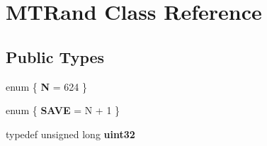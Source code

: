 \hypertarget{classMTRand}{}\section{M\+T\+Rand Class Reference}
\label{classMTRand}
\subsection*{Public Types}
\begin{DoxyCompactItemize}
\item 
\hypertarget{classMTRand_ab8fea37d16b55e1a0fe06149e325f1b6}{}enum \{ {\bfseries N} = 624
 \}\label{classMTRand_ab8fea37d16b55e1a0fe06149e325f1b6}

\item 
\hypertarget{classMTRand_a7d9f4f1783a4e45f7834dd5174dfc2a1}{}enum \{ {\bfseries S\+A\+V\+E} = N + 1
 \}\label{classMTRand_a7d9f4f1783a4e45f7834dd5174dfc2a1}

\item 
\hypertarget{classMTRand_a45478edf9e24dcd2a5164bac3889d6a2}{}typedef unsigned long {\bfseries uint32}\label{classMTRand_a45478edf9e24dcd2a5164bac3889d6a2}

\end{DoxyCompactItemize}
